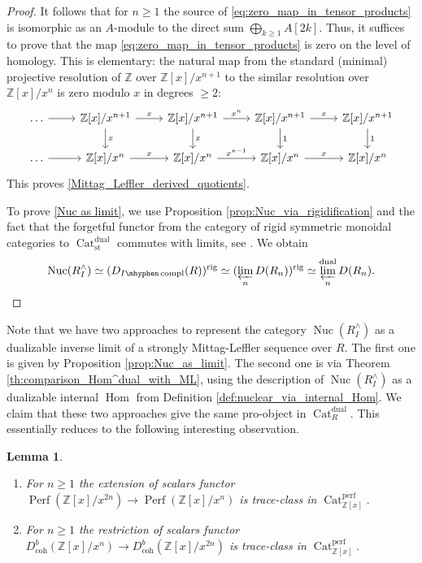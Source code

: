 \documentclass[11pt,leqno]{amsart}
\newtheorem{lemma}[theo]{Lemma}
\numberwithin{equation}{section}
\def\Z{\mathbb{Z}}
\def\coh{\operatorname{coh}}
\def\Hom{\operatorname{Hom}}
\newcommand{\hy}{\mhyphen}
\newcommand{\prolim}[1][]{\mathop{\varprojlim}\limits_{#1}}
\newcommand{\biggplus}[1][]{\mathop{\bigoplus}\limits_{#1}}
\newcommand{\rig}{\operatorname{rig}}
\newcommand{\Nuc}{\operatorname{Nuc}}
\newcommand{\Cat}{\operatorname{Cat}}
\newcommand{\st}{\operatorname{st}}
\newcommand{\dual}{\operatorname{dual}}
\newcommand{\Perf}{\operatorname{Perf}}
\newcommand{\perf}{\operatorname{perf}}
\newcommand{\compl}{\operatorname{compl}}
\begin{document}
\begin{proof}
It follows that for $n\geq 1$ the source of \eqref{eq:zero_map_in_tensor_products} is isomorphic as an $A$-module to the direct sum $\biggplus[k\geq 1]A[2k].$ Thus, it suffices to prove that the map \eqref{eq:zero_map_in_tensor_products} is zero on the level of homology. This is elementary: the natural map from the standard (minimal) projective resolution of $\Z$ over $\Z[x]/x^{n+1}$ to the similar resolution over $\Z[x]/x^n$ is zero modulo $x$ in degrees $\geq 2:$
\begin{equation*}
\begin{tikzcd}
\dots \ar[r] & \Z[x]/x^{n+1}\ar[r, "x"]\ar[d, "x"] & \Z[x]/x^{n+1}\ar[r, "x^n"]\ar[d, "x"] & \Z[x]/x^{n+1} \ar[r, "x"]\ar[d, "1"] & \Z[x]/x^{n+1}\ar[d, "1"]\\
\dots \ar[r] & \Z[x]/x^{n}\ar[r, "x"] & \Z[x]/x^{n}\ar[r, "x^{n-1}"] & \Z[x]/x^{n} \ar[r, "x"] & \Z[x]/x^{n}
\end{tikzcd}
\end{equation*}
This proves \ref{Mittag_Leffler_derived_quotients}. 

To prove \ref{Nuc as limit}, we use Proposition \ref{prop:Nuc_via_rigidification} and the fact that the forgetful functor from the category of rigid symmetric monoidal categories to $\Cat_{\st}^{\dual}$ commutes with limits, see \cite[Corollary 4.85]{Ram24b}. We obtain
\begin{equation*}
\Nuc(R^{\wedge}_I)\simeq (D_{I\hy\compl}(R))^{\rig}\simeq (\prolim[n]D(R_n))^{\rig}\simeq \prolim[n]^{\dual}D(R_n).\qedhere
\end{equation*}
\end{proof}

Note that we have two approaches to represent the category $\Nuc(R^{\wedge}_I)$ as a dualizable inverse limit of a strongly Mittag-Leffler sequence over $R.$ The first one is given by Proposition \ref{prop:Nuc_as_limit}. The second one is via Theorem \ref{th:comparison_Hom^dual_with_ML}, using the description of $\Nuc(R^{\wedge}_I)$ as a dualizable internal $\Hom$ from Definition \ref{def:nuclear_via_internal_Hom}. We claim that these two approaches give the same pro-object in $\Cat_R^{\dual}.$ This essentially reduces to the following interesting observation.

\begin{lemma}\label{lem:extension_restriction_of_scalars_trace_class}
\begin{enumerate}[label=(\roman*), ref=(\roman*)]
\item For $n\geq 1$ the extension of scalars functor $\Perf(\Z[x]/x^{2n})\to\Perf(\Z[x]/x^n)$ is trace-class in $\Cat_{\Z[x]}^{\perf}.$ \label{pullback_is_trace_class}

\item For $n\geq 1$ the restriction of scalars functor $D^b_{\coh}(\Z[x]/x^n)\to D^b_{\coh}(\Z[x]/x^{2n})$ is trace-class in $\Cat_{\Z[x]}^{\perf}.$  \label{pushforward_is_trace_class}
\end{enumerate}
\end{lemma}
\end{document}
